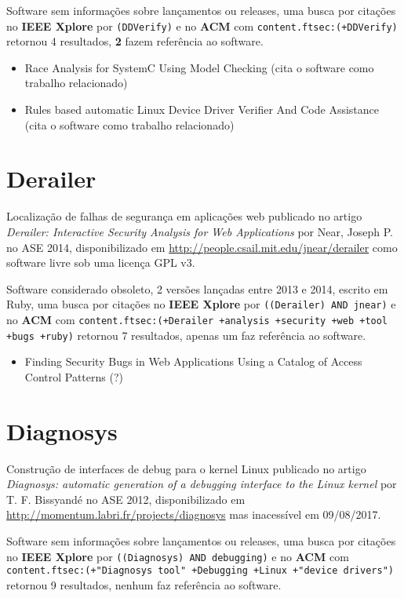 Software sem informações sobre lançamentos ou releases,
uma busca por citações no {\bf IEEE Xplore} por
\texttt{(DDVerify)}
e no {\bf ACM} com
\texttt{content.ftsec:(+DDVerify)}
retornou
4 resultados,
{\bf 2} fazem referência ao software.

\begin{itemize}
\item Race Analysis for SystemC Using Model Checking (cita o software como trabalho relacionado)
\item Rules based automatic Linux Device Driver Verifier And Code Assistance (cita o software como trabalho relacionado)
\end{itemize}

\section{Derailer}

Localização de falhas de segurança em aplicações web
publicado no artigo {\it Derailer: Interactive Security Analysis for Web Applications}
por Near, Joseph P.
no ASE 2014,
disponibilizado em \url{http://people.csail.mit.edu/jnear/derailer}
como software livre
sob uma licença GPL v3.

Software considerado obsoleto,
2 versões lançadas
entre 2013 e 2014,
escrito em Ruby,
uma busca por citações no {\bf IEEE Xplore} por
\texttt{((Derailer) AND jnear)}
e no {\bf ACM} com
\texttt{content.ftsec:(+Derailer +analysis +security +web +tool +bugs +ruby)}
retornou
7 resultados,
apenas um faz referência ao software.

\begin{itemize}
\item Finding Security Bugs in Web Applications Using a Catalog of Access Control Patterns (?)
\end{itemize}

\section{Diagnosys}

Construção de interfaces de debug para o kernel Linux
publicado no artigo {\it Diagnosys: automatic generation of a debugging interface to the Linux kernel}
por T. F. Bissyandé
no ASE 2012,
disponibilizado em \url{http://momentum.labri.fr/projects/diagnosys}
mas inacessível em 09/08/2017.

Software sem informações sobre lançamentos ou releases,
uma busca por citações no {\bf IEEE Xplore} por
\texttt{((Diagnosys) AND debugging)}
e no {\bf ACM} com
\texttt{content.ftsec:(+"Diagnosys tool" +Debugging +Linux +"device drivers")}
retornou
9 resultados,
nenhum faz referência ao software.


